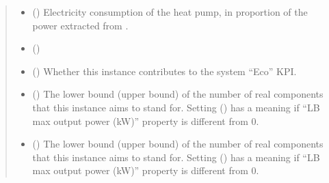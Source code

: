 \documentclass[letterpaper,10pt,english]{sphinxmanual}
\begin{document}
\begin{fulllineitems}
\begin{fulllineitems}
\begin{quote}
\begin{description}
\begin{itemize}
\item {} 
\sphinxAtStartPar
{} (\sphinxstyleliteralemphasis{\sphinxupquote{, }}\sphinxstyleliteralemphasis{\sphinxupquote{, }}) \textendash{} Electricity consumption of the heat pump, in proportion of the power extracted from .

\item {} 
\sphinxAtStartPar
{} (\sphinxstyleliteralemphasis{\sphinxupquote{, }}) \textendash{} 

\item {} 
\sphinxAtStartPar
{} (\sphinxstyleliteralemphasis{\sphinxupquote{, }}\sphinxstyleliteralemphasis{\sphinxupquote{, }}) \textendash{} Whether this instance contributes to the system “Eco” KPI.

\item {} 
\sphinxAtStartPar
{} (\sphinxstyleliteralemphasis{\sphinxupquote{, }}\sphinxstyleliteralemphasis{\sphinxupquote{, }}) \textendash{} The lower bound (upper bound) of the number of real components that this instance aims to stand for.
Setting  () has a meaning if “LB max output power (kW)” property is
different from 0.

\item {} 
\sphinxAtStartPar
{} (\sphinxstyleliteralemphasis{\sphinxupquote{, }}\sphinxstyleliteralemphasis{\sphinxupquote{, }}) \textendash{} The lower bound (upper bound) of the number of real components that this instance aims to stand for.
Setting  () has a meaning if “LB max output power (kW)” property is
different from 0.


\end{itemize}
\end{description}
\end{quote}
\end{fulllineitems}
\end{fulllineitems}
\end{document}
